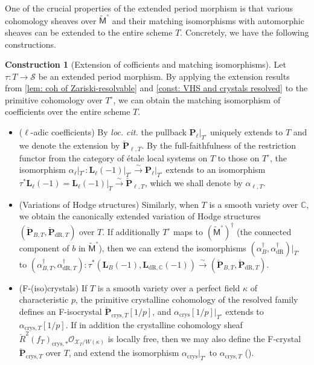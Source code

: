 \documentclass[11pt, letterpaper]{amsart}
\theoremstyle{plain}
\theoremstyle{definition}
\newtheorem{construction}[theorem]{Construction}
\newcommand{\IC}{\mathbb{C}}
\newcommand{\<}{\langle}
\renewcommand{\>}{\rangle}
\def\wt{\widetilde}
\newcommand{\sO}{\mathcal{O}}
\newcommand{\shS}{\mathscr{S}}
\newcommand{\sfM}{\mathsf{M}}
\newcommand{\sX}{\mathcal{X}}
\newcommand{\bL}{\mathbf{L}}
\newcommand{\crys}{\mathrm{crys}}
\newcommand{\bP}{\mathbf{P}}
\newcommand{\dR}{\mathrm{dR}}
\newcommand{\sto}{\stackrel{\sim}{\to}}
\newcommand{\mpr}{\textcolor{purple}}
\begin{document}
One of the crucial properties of the extended period morphism is that various cohomology sheaves over $\wt{\sfM}^\circ$ and their matching isomorphisms with automorphic sheaves can be extended to the entire scheme $T$.
Concretely, we have the following constructions.
\begin{construction}[Extension of cofficients and matching isomorphisms]
\label{const: extend comparison}
Let $\tau:T\to \shS$ be an extended period morphism.
By applying the extension results from \cref{lem: coh of Zariski-resolvable} and \cref{const: VHS and crystals resolved} to the primitive cohomology over $T^\circ$, 
we can obtain the matching isomorphism of coefficients over the entire scheme $T$. 
\begin{itemize}
    \item ($\ell$-adic coefficients) By \textit{loc. cit.} the pullback $\bP_\ell|_{T^\circ}$ uniquely extends to $T$ and we denote the extension by $\breve{\bP}_{\ell, T}$. 
By the full-faithfulness of the restriction functor from the category of \'etale local systems on $T$ to those on $T^\circ$, the isomorphism $\alpha_{\ell}|_{T^\circ} : \bL_\ell(-1)|_{T^\circ} \sto \bP_\ell|_{T^\circ}$ extends to an isomorphism $\tau^* \bL_\ell(-1) = \bL_\ell(-1)|_T \sto \breve{\bP}_{\ell, T} $, which we shall denote by $\alpha_{\ell, T}$.  
\item (Variations of Hodge structures) Similarly, when $T$ is a smooth variety over $\IC$, we obtain the canonically extended variation of Hodge structures $(\breve{\bP}_{B, T}, \breve{\bP}_{\dR, T})$ over $T$.
If additionally $T^\circ$ maps to $(\wt{\sfM}^\circ)^\dagger$ (the connected component of $b$ in $\wt{\sfM}^\circ$), then we can extend the isomorphisms $(\alpha^\dagger_B, \alpha^\dagger_\dR)|_{T^\circ}$ to $(\alpha^\dagger_{B, T}, \alpha^\dagger_{\dR, T}) : \tau^*(\bL_B(-1), \bL_{\dR, \IC}(-1)) \sto  (\breve{\bP}_{B, T}, \breve{\bP}_{\dR, T})$.

\item (F-(iso)crystals) If $T$ is a smooth variety over a perfect field $\kappa$ of characteristic $p$, the primitive crystalline cohomology of the resolved family defines an F-isocrystal $\breve{\bP}_{\crys, T}[1/p]$, 
and $\alpha_{\crys}[1/p]|_{T^\circ}$ extends to $\alpha_{\crys, T}[1/p]$.
If in addition the crystalline cohomology sheaf $\breve{R}^2 (f_T)_{\crys, *} \sO_{\sX_T/W(\kappa)}$ is locally free, then we may also define the F-crystal $\breve{\bP}_{\crys, T}$ over $T$, and extend the isomorphism $\alpha_{\crys}|_{T^\circ}$ to $\alpha_{\crys, T}$ (). 
\end{itemize}
\end{construction}
\end{document}
